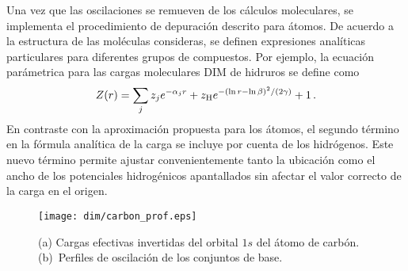 Una vez que las oscilaciones se remueven de los cálculos moleculares, 
se implementa el procedimiento de depuración descrito para átomos. 
De acuerdo a la estructura de las moléculas consideras, se definen 
expresiones analíticas particulares para diferentes grupos de compuestos.
Por ejemplo, la ecuación parámetrica para las cargas moleculares DIM de
hidruros se define como
\begin{eqnarray}
 Z(r) = \sum_j z_j e^{-\alpha_j r} 
 + z_{\mbox{\scriptsize H}} e^{-(\ln r - \ln \beta)^2/(2\gamma)} 
 + 1\,.
 \label{eq:molzDIM}
\end{eqnarray}
En contraste con la aproximación propuesta para los átomos, el segundo 
término en la fórmula analítica de la carga se incluye por cuenta de los 
hidrógenos. Este nuevo término permite ajustar convenientemente tanto la 
ubicación como el ancho de los potenciales hidrogénicos apantallados sin 
afectar el valor correcto de la carga en el origen.

\begin{figure}[t]
\centering
\texttt{[image: dim/carbon\_prof.eps]}
\caption[Inversión de orbitales descritos con conjuntos de base finitos.]
{(a) Cargas efectivas invertidas del orbital $1s$ del átomo de carbón.
(b)~Perfiles de oscilación de los conjuntos de base.}
\label{fig:1sCarbon}
\end{figure}

